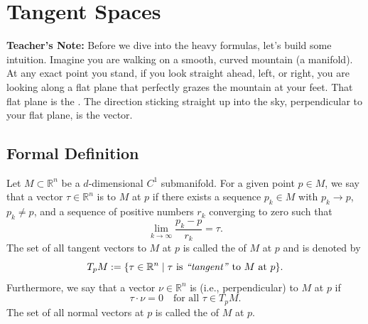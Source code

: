 \section{Tangent Spaces} %


\noindent
\textbf{Teacher's Note:} Before we dive into the heavy formulas, let's build some intuition. Imagine you are walking on a smooth, curved mountain (a manifold). At any exact point you stand, if you look straight ahead, left, or right, you are looking along a flat plane that perfectly grazes the mountain at your feet. That flat plane is the . The direction sticking straight up into the sky, perpendicular to your flat plane, is the  vector. 

\subsection{Formal Definition}

\setcounter{savedSec}{\value{section}}
\setcounter{savedThm}{\value{theorem}}
\setcounter{section}{12}
\setcounter{theorem}{12} 

\begin{theorem} %
Let $M \subset \mathbb{R}^n$ be a $d$-dimensional $C^1$ submanifold. %
For a given point $p \in M$, we say that a vector $\tau \in \mathbb{R}^n$ is  to $M$ at $p$ if there exists a sequence $p_k \in M$ with $p_k \to p$, $p_k \neq p$, and a sequence of positive numbers $r_k$ converging to zero such that %
\[
\lim_{k \to \infty} \frac{p_k - p}{r_k} = \tau. %
\]
The set of all tangent vectors to $M$ at $p$ is called the  of $M$ at $p$ and is denoted by %
\[
T_pM := \{ \tau \in \mathbb{R}^n \mid \tau \text{ is \qt{tangent} to } M \text{ at } p \}. %
\]
Furthermore, we say that a vector $\nu \in \mathbb{R}^n$ is  (i.e., perpendicular) to $M$ at $p$ if %
\[
\tau \cdot \nu = 0 \quad \text{for all } \tau \in T_pM. %
\]
The set of all normal vectors at $p$ is called the  of $M$ at $p$. %
\end{theorem}

\setcounter{section}{\value{savedSec}}
\setcounter{theorem}{\value{savedThm}}


